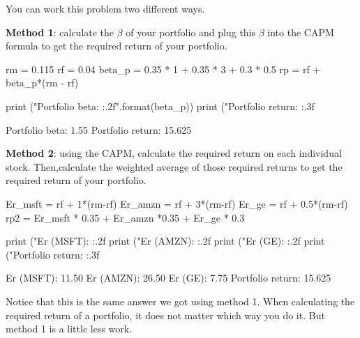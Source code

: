 \cprotEnv \begin{solution}
You can work this problem two different ways.

\textbf{Method 1}: calculate the \(\beta\) of your portfolio and plug this \(\beta\) into the CAPM formula to get the required return of your portfolio.

\begin{ipython}
rm = 0.115
rf = 0.04
beta_p = 0.35 * 1 + 0.35 * 3 + 0.3 * 0.5
rp = rf + beta_p*(rm - rf)

print ("Portfolio beta: {:.2f}".format(beta_p))
print ("Portfolio return: {:.3f}%

Portfolio beta: 1.55
Portfolio return: 15.625%
\end{ipython}

\textbf{Method 2}: using the CAPM, calculate the required return on each individual stock. Then,calculate the weighted average of those required returns to get the required return of your portfolio.

\begin{ipython}
Er_msft = rf + 1*(rm-rf)
Er_amzn = rf + 3*(rm-rf)
Er_ge = rf + 0.5*(rm-rf)
rp2 = Er_msft * 0.35 + Er_amzn *0.35 + Er_ge * 0.3

print ("Er (MSFT): {:.2f}%
print ("Er (AMZN): {:.2f}%
print ("Er (GE): {:.2f}%
print ("Portfolio return: {:.3f}%

Er (MSFT): 11.50%
Er (AMZN): 26.50%
Er (GE): 7.75%
Portfolio return: 15.625%
\end{ipython}
Notice that this is the same answer we got using method 1. When calculating the required return of a portfolio, it does not matter which way you do it. But method 1 is a little less work.
\end{solution}

